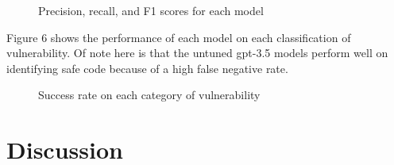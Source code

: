 \documentclass[acmsmall]{acmart}
\begin{document}
\begin{figure}[htp] 
\caption{Precision, recall, and F1 scores for each model}
\end{figure}

Figure 6 shows the performance of each model on each classification of vulnerability. Of note here is that the untuned gpt-3.5 models perform well on identifying safe code because of a high false negative rate.

\begin{figure}[htp] 
\caption{Success rate on each category of vulnerability}
\end{figure}
\section{Discussion}
\end{document}
